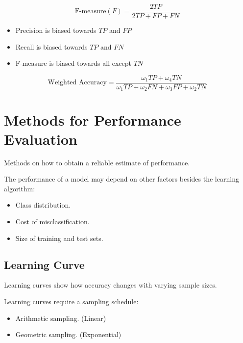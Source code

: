 \begin{equation}
    \text{F-measure}(F) = \frac{2TP}{2TP+FP+FN}
\end{equation}

\begin{itemize}
    \item Precision is biased towards $TP$ and $FP$
    \item Recall is biased towards $TP$ and $FN$
    \item F-measure is biased towards all except $TN$
\end{itemize}

\begin{equation}
    \text{Weighted Accuracy} = \frac{\omega_1 TP + \omega_4 TN}{\omega_1 TP + \omega_2 FN + \omega_3 FP + \omega_2 TN}
\end{equation}

\section{Methods for Performance Evaluation}
Methods on how to obtain a reliable estimate of performance.

The performance of a model may depend on other factors besides the learning algorithm:
\begin{itemize}
    \item Class distribution.
    \item Cost of misclassification.
    \item Size of training and test sets.
\end{itemize}

\subsection{Learning Curve}
Learning curves show how accuracy changes with varying sample sizes.

Learning curves require a sampling schedule:
\begin{itemize}
    \item Arithmetic sampling. (Linear)
    \item Geometric sampling. (Exponential)
\end{itemize}

